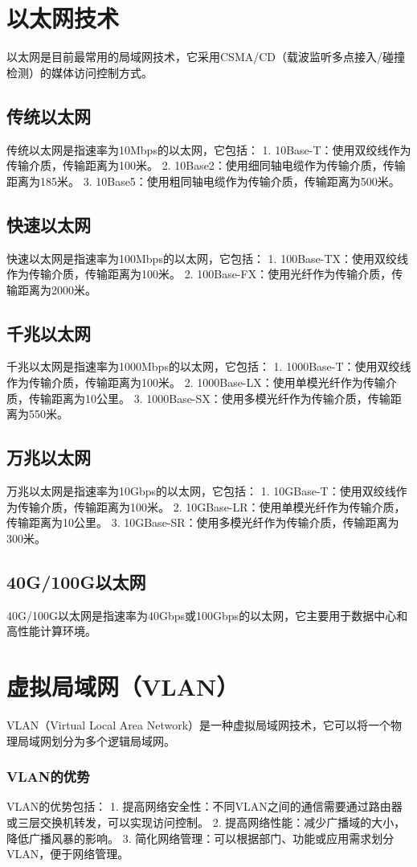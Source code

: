 \documentclass{book}
\begin{document}
\section{以太网技术}
以太网是目前最常用的局域网技术，它采用CSMA/CD（载波监听多点接入/碰撞检测）的媒体访问控制方式。
\subsection{传统以太网}
传统以太网是指速率为10Mbps的以太网，它包括：
1. 10Base-T：使用双绞线作为传输介质，传输距离为100米。
2. 10Base2：使用细同轴电缆作为传输介质，传输距离为185米。
3. 10Base5：使用粗同轴电缆作为传输介质，传输距离为500米。
\subsection{快速以太网}
快速以太网是指速率为100Mbps的以太网，它包括：
1. 100Base-TX：使用双绞线作为传输介质，传输距离为100米。
2. 100Base-FX：使用光纤作为传输介质，传输距离为2000米。
\subsection{千兆以太网}
千兆以太网是指速率为1000Mbps的以太网，它包括：
1. 1000Base-T：使用双绞线作为传输介质，传输距离为100米。
2. 1000Base-LX：使用单模光纤作为传输介质，传输距离为10公里。
3. 1000Base-SX：使用多模光纤作为传输介质，传输距离为550米。
\subsection{万兆以太网}
万兆以太网是指速率为10Gbps的以太网，它包括：
1. 10GBase-T：使用双绞线作为传输介质，传输距离为100米。
2. 10GBase-LR：使用单模光纤作为传输介质，传输距离为10公里。
3. 10GBase-SR：使用多模光纤作为传输介质，传输距离为300米。
\subsection{40G/100G以太网}
40G/100G以太网是指速率为40Gbps或100Gbps的以太网，它主要用于数据中心和高性能计算环境。
\section{虚拟局域网（VLAN）}
VLAN（Virtual Local Area Network）是一种虚拟局域网技术，它可以将一个物理局域网划分为多个逻辑局域网。
\subsubsection{VLAN的优势}
VLAN的优势包括：
1. 提高网络安全性：不同VLAN之间的通信需要通过路由器或三层交换机转发，可以实现访问控制。
2. 提高网络性能：减少广播域的大小，降低广播风暴的影响。
3. 简化网络管理：可以根据部门、功能或应用需求划分VLAN，便于网络管理。
\end{document}
